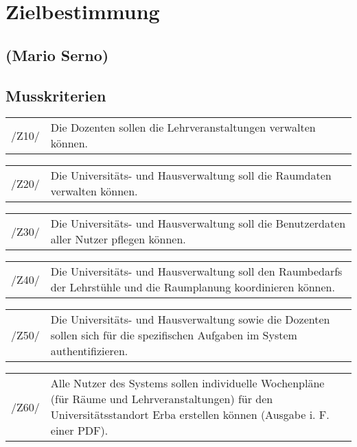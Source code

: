 \section{Zielbestimmung}
\label{sec:Zielbestimmung}

\subsection*{(Mario Serno)}

\subsection{Musskriterien}

\begin{tabular}{p{1.5cm}p{14.5cm}}	
	 /Z10/& Die Dozenten sollen die Lehrveranstaltungen verwalten können. \\[0.25cm]
\end{tabular}

\begin{tabular}{p{1.5cm}p{14.5cm}}	
	 /Z20/& Die Universitäts- und Hausverwaltung soll die Raumdaten verwalten können. \\[0.25cm]
\end{tabular}

\begin{tabular}{p{1.5cm}p{14.5cm}}	
	 /Z30/& Die Universitäts- und Hausverwaltung soll die Benutzerdaten aller Nutzer pflegen können. \\[0.25cm]
\end{tabular}

\begin{tabular}{p{1.5cm}p{14.5cm}}	
	 /Z40/& Die Universitäts- und Hausverwaltung soll den Raumbedarfs der Lehrstühle und die Raumplanung koordinieren können.  \\[0.25cm]
\end{tabular}

\begin{tabular}{p{1.5cm}p{14.5cm}}	
	 /Z50/& Die Universitäts- und Hausverwaltung sowie die Dozenten sollen sich für die spezifischen Aufgaben im System authentifizieren. \\[0.25cm]
\end{tabular}

\begin{tabular}{p{1.5cm}p{14.5cm}}	
	 /Z60/& Alle Nutzer des Systems sollen individuelle Wochenpläne (für Räume und Lehrveranstaltungen) für den Universitätsstandort Erba erstellen können (Ausgabe i. F. einer PDF). \\[0.25cm]
\end{tabular}

